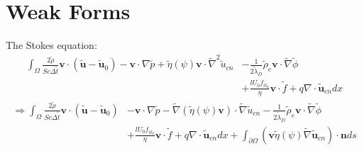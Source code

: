 \documentclass[a4paper,10pt]{article}
\numberwithin{equation}{section}
\numberwithin{figure}{section}
\begin{document}
\section{Weak Forms}
The Stokes equation: 
\begin{align}
\int_\Omega \frac{2\tilde{\rho}}{Sc\Delta\tilde{t}} \mathbf{v}\cdot\left(\tilde{\mathbf{u}}-\tilde{\mathbf{u}}_0\right) - \mathbf{v}\cdot \nabla \tilde{p} + \tilde{\eta}(\psi)\mathbf{v}\cdot\tilde{\nabla}^2\tilde{u}_{cn} &- \frac{1}{2\tilde{\lambda}_D}\tilde{\rho}_e\mathbf{v}\cdot\tilde{\nabla}\tilde{\phi}\\\nonumber
 &+\frac{l U_0 f_{it_0}}{\eta}\mathbf{v}\cdot\tilde{f}+q\nabla\cdot\tilde{\mathbf{u}}_{cn} dx
\end{align}
\begin{align}
\Rightarrow \int_\Omega \frac{2\tilde{\rho}}{Sc\Delta\tilde{t}} \mathbf{v}\cdot\left(\tilde{\mathbf{u}}-\tilde{\mathbf{u}}_0\right) &- \mathbf{v}\cdot \nabla \tilde{p} -\tilde{\nabla}\left(\tilde{\eta}(\psi)\mathbf{v}\right)\cdot\tilde{\nabla}\tilde{u}_{cn}  -\frac{1}{2\tilde{\lambda}_D}\tilde{\rho}_e\mathbf{v}\cdot\tilde{\nabla}\tilde{\phi}\\\nonumber
&+\frac{l U_0 f_{it_0}}{\eta}\mathbf{v}\cdot\tilde{f}+q\nabla\cdot\tilde{\mathbf{u}}_{cn} dx  +\int_{\partial\Omega}\left(\mathbf{v}\tilde{\eta}(\psi)\tilde{\nabla}\tilde{\mathbf{u}}_{cn}\right)\cdot\mathbf{n}ds
\end{align}
 
\end{document}
